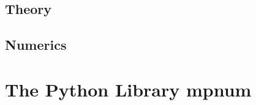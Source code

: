 %

\subsection{Theory}%
\subsection{Numerics}%

\section{The Python Library mpnum}%
\label{sec:tensors.mpnum}

